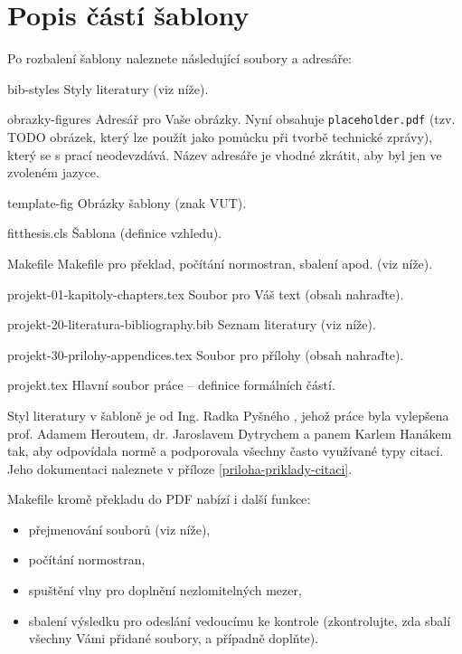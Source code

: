 \section*{Popis částí šablony}

Po rozbalení šablony naleznete následující soubory a adresáře:
\begin{DESCRIPTION}
  \item [bib-styles] Styly literatury (viz níže). 
  \item [obrazky-figures] Adresář pro Vaše obrázky. Nyní obsahuje \texttt{placeholder.pdf} (tzv. TODO obrázek, který lze použít jako pomůcku při tvorbě technické zprávy), který se s prací neodevzdává. Název adresáře je vhodné zkrátit, aby byl jen ve zvoleném jazyce.
  \item [template-fig] Obrázky šablony (znak VUT).
  \item [fitthesis.cls] Šablona (definice vzhledu).
  \item [Makefile] Makefile pro překlad, počítání normostran, sbalení apod. (viz níže).
  \item [projekt-01-kapitoly-chapters.tex] Soubor pro Váš text (obsah nahraďte).
  \item [projekt-20-literatura-bibliography.bib] Seznam literatury (viz níže).
  \item [projekt-30-prilohy-appendices.tex] Soubor pro přílohy (obsah nahraďte).
  \item [projekt.tex] Hlavní soubor práce -- definice formálních částí.
\end{DESCRIPTION}

Styl literatury v šabloně je od Ing. Radka Pyšného \cite{Pysny}, jehož práce byla vylepšena prof. Adamem Heroutem, dr. Jaroslavem Dytrychem a panem Karlem Hanákem tak, aby odpovídala normě a podporovala všechny často využívané typy citací. Jeho dokumentaci naleznete v příloze \ref{priloha-priklady-citaci}.

\begin{samepage}
Makefile kromě překladu do PDF nabízí i další funkce:
\begin{itemize}
  \item přejmenování souborů (viz níže),
  \item počítání normostran,
  \item spuštění vlny pro doplnění nezlomitelných mezer,
  \item sbalení výsledku pro odeslání vedoucímu ke kontrole (zkontrolujte, zda sbalí všechny Vámi přidané soubory, a případně doplňte).
\end{itemize}
\end{samepage}

